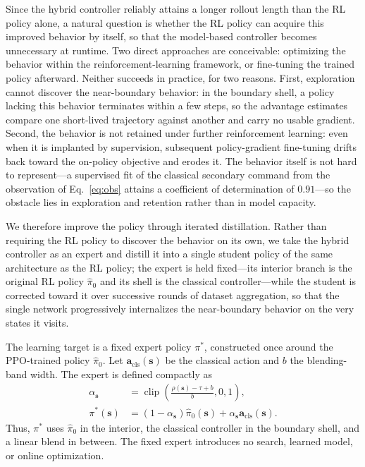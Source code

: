 \documentclass[journal, twoside]{IEEEtran}
\begin{document}
Since the hybrid controller reliably attains a longer rollout length than the RL policy alone, a natural question is whether the RL policy can acquire this improved behavior by itself, so that the model-based controller becomes unnecessary at runtime. Two direct approaches are conceivable: optimizing the behavior within the reinforcement-learning framework, or fine-tuning the trained policy afterward. Neither succeeds in practice, for two reasons. First, exploration cannot discover the near-boundary behavior: in the boundary shell, a policy lacking this behavior terminates within a few steps, so the advantage estimates compare one short-lived trajectory against another and carry no usable gradient. Second, the behavior is not retained under further reinforcement learning: even when it is implanted by supervision, subsequent policy-gradient fine-tuning drifts back toward the on-policy objective and erodes it. The behavior itself is not hard to represent---a supervised fit of the classical secondary command from the observation of Eq.~\eqref{eq:obs} attains a coefficient of determination of $0.91$---so the obstacle lies in exploration and retention rather than in model capacity.

We therefore improve the policy through iterated distillation. Rather than requiring the RL policy to discover the behavior on its own, we take the hybrid controller as an expert and distill it into a single student policy of the same architecture as the RL policy; the expert is held fixed---its interior branch is the original RL policy $\hat{\pi}_{0}$ and its shell is the classical controller---while the student is corrected toward it over successive rounds of dataset aggregation, so that the single network progressively internalizes the near-boundary behavior on the very states it visits.

The learning target is a fixed expert policy $\pi^{*}$, constructed once around the PPO-trained policy $\hat{\pi}_{0}$. Let $\mathbf{a}_{\mathrm{cls}}(\mathbf{s})$ be the classical action and $b$ the blending-band width. The expert is defined compactly as
\begin{equation}
\begin{aligned}
\alpha_{\mathbf{s}}&=\operatorname{clip}\!\left(\frac{\rho(\mathbf{s})-\tau+b}{b},0,1\right),\\
\pi^{*}(\mathbf{s})&=(1-\alpha_{\mathbf{s}})\hat{\pi}_{0}(\mathbf{s})
                     +\alpha_{\mathbf{s}}\mathbf{a}_{\mathrm{cls}}(\mathbf{s}).
\end{aligned}
\label{eq:fixed_expert}
\end{equation}
Thus, $\pi^{*}$ uses $\hat{\pi}_{0}$ in the interior, the classical controller in the boundary shell, and a linear blend in between. The fixed expert introduces no search, learned model, or online optimization.
\end{document}
